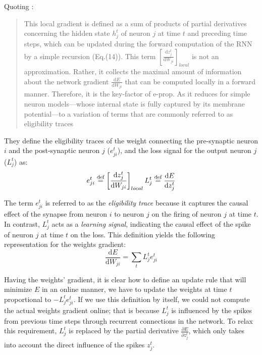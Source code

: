 Quoting \cite{eprop2020}:
\begin{quote}
This local gradient is defined as a sum of products of partial
derivatives concerning the hidden state $h^t_j$ of neuron $j$ at time $t$ and preceding time steps, which can be updated during the
forward computation of the RNN by a simple recursion (Eq.(14)). This term $\left[ \frac{\mathrm{d}z_j^t}{\mathrm{d}{W_{ji}}} \right]_{local}$ is not an approximation. Rather, it collects the maximal amount of information about the network gradient $\frac{\mathrm{d}E}{\mathrm{d} W_{ji}}$ that can be computed locally in a forward manner. Therefore, it is the key-factor of e-prop. As it reduces for simple neuron models—whose internal state is fully captured by its membrane potential—to a variation of terms that are commonly referred to as eligibility traces
\end{quote}
They define the eligibility traces of the weight connecting the pre-synaptic neuron $i$ and the post-synaptic neuron $j$ ($e^t_{ji}$), and the loss signal for the output neuron $j$ ($L^t_j$) as:
$$
    e^t_{ji} \stackrel{\text{def}}{=} \left[ \frac{\mathrm{d}z_j^t}{\mathrm{d}{W_{ji}}} \right]_{local}
    L^t_j \stackrel{\text{def}}{=} \frac{\mathrm{d}E}{\mathrm{d}z^t_j} 
$$

The term $e^t_{ji}$ is referred to as the \emph{eligibility trace} because it captures the causal effect of the synapse from neuron $i$ to neuron $j$ on the firing of neuron $j$ at time $t$. In contrast, $L^t_j$ acts as a \emph{learning signal}, indicating the causal effect of the spike of neuron $j$ at time $t$ on the loss. This definition yields the following representation for the weights gradient:
\begin{equation} \label{eq:SumLossEtraces}
\frac{\mathrm{d}E}{\mathrm{d}W_{ji}} = \sum_t L^t_je^t_{ji}
\end{equation}

Having the weights' gradient, it is clear how to define an update rule that will minimize $E$ in an online manner, we have to update the weights at time $t$ proportional to $-L^t_je^t_{ji}$. If we use this definition by itself, we could not compute the actual weights gradient online; that is because $L^t_j$ is influenced by the spikes from previous time steps through recurrent connections in the network. To relax this requirement, $L^t_j$ is replaced by the partial derivative $\frac{\partial E}{\partial z^t_j}$, which only takes into account the direct influence of the spikes $z^t_j$.

